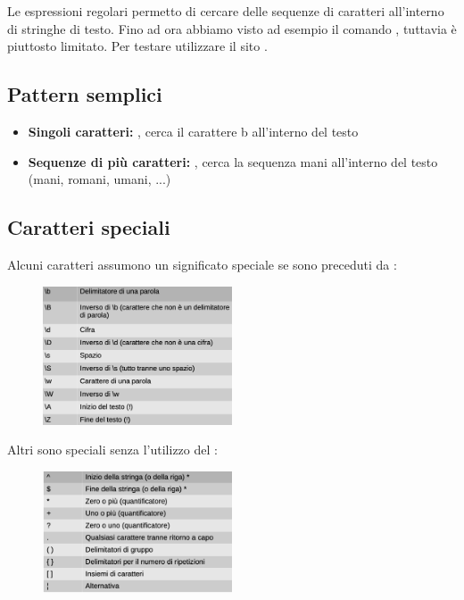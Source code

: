 \documentclass[../main.tex]{subfiles}
\begin{document}
Le espressioni regolari permetto di cercare delle sequenze di caratteri all'interno di stringhe di testo. Fino ad ora abbiamo visto ad
esempio il comando , tuttavia è piuttosto limitato. Per testare utilizzare il sito .

\subsection{Pattern semplici}
\begin{itemize}
    \item \textbf{Singoli caratteri: } , cerca il carattere b all'interno del testo
    \item \textbf{Sequenze di più caratteri: },  cerca la sequenza mani all'interno del testo (mani, romani, umani, ...)
\end{itemize}

\subsection{Caratteri speciali}
Alcuni caratteri assumono un significato speciale se sono preceduti da \code{\textbackslash}:
\begin{figure}[h]
    \centering
    \includegraphics[width=0.5\textwidth]{../images/caratteriRegExp.png}
\end{figure}

\vspace{0.25cm}
Altri sono speciali senza l'utilizzo del \code{\textbackslash}:
\begin{figure}[h]
    \centering
    \includegraphics[width=0.5\textwidth]{../images/caratteriSpeciali.png}
\end{figure}
\end{document}
